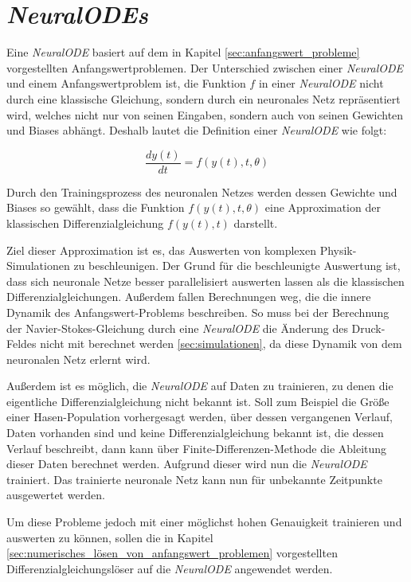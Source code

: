 
\section{\textit{NeuralODEs}} \label{sec:neural_ode}

Eine \textit{NeuralODE} \cite{neuralode} basiert auf dem in Kapitel \ref{sec:anfangswert_probleme} vorgestellten Anfangswertproblemen.
Der Unterschied zwischen einer \textit{NeuralODE} und einem Anfangswertproblem ist, 
die Funktion $f$ in einer \textit{NeuralODE} nicht durch eine klassische Gleichung, sondern durch ein 
neuronales Netz repräsentiert wird, welches nicht nur von seinen 
Eingaben, sondern auch von seinen Gewichten und Biases abhängt.
Deshalb lautet die Definition einer \textit{NeuralODE} wie folgt:

$$
\frac{d y(t)}{dt} = f(y(t), t, \theta)
$$

Durch den Trainingsprozess des neuronalen Netzes werden dessen Gewichte und Biases 
so gewählt, dass die Funktion $f(y(t), t, \theta)$ eine Approximation der klassischen 
Differenzialgleichung $f(y(t), t)$ darstellt.

Ziel dieser Approximation ist es, das Auswerten von komplexen Physik-Simulationen zu beschleunigen.
Der Grund für die beschleunigte Auswertung ist, dass sich neuronale Netze besser parallelisiert auswerten lassen
als die klassischen Differenzialgleichungen.
Außerdem fallen Berechnungen weg, die die innere Dynamik des Anfangswert-Problems beschreiben.
So muss bei der Berechnung der Navier-Stokes-Gleichung durch eine \textit{NeuralODE} die Änderung des Druck-Feldes 
nicht mit berechnet werden \ref{sec:simulationen}, da diese Dynamik von dem neuronalen Netz erlernt wird.

Außerdem ist es möglich, die \textit{NeuralODE} auf Daten zu trainieren, 
zu denen die eigentliche Differenzialgleichung nicht bekannt ist.
Soll zum Beispiel die Größe einer Hasen-Population vorhergesagt werden, über dessen vergangenen Verlauf, Daten vorhanden sind und keine 
Differenzialgleichung bekannt ist, die dessen Verlauf beschreibt,
dann kann über Finite-Differenzen-Methode die Ableitung dieser Daten berechnet werden.
Aufgrund dieser wird nun die \textit{NeuralODE} trainiert.
Das trainierte neuronale Netz kann nun für unbekannte Zeitpunkte ausgewertet werden.

Um diese Probleme jedoch mit einer möglichst hohen Genauigkeit trainieren und auswerten zu können,
sollen die in Kapitel \ref{sec:numerisches_lösen_von_anfangswert_problemen} vorgestellten Differenzialgleichungslöser auf die \textit{NeuralODE} angewendet werden.







